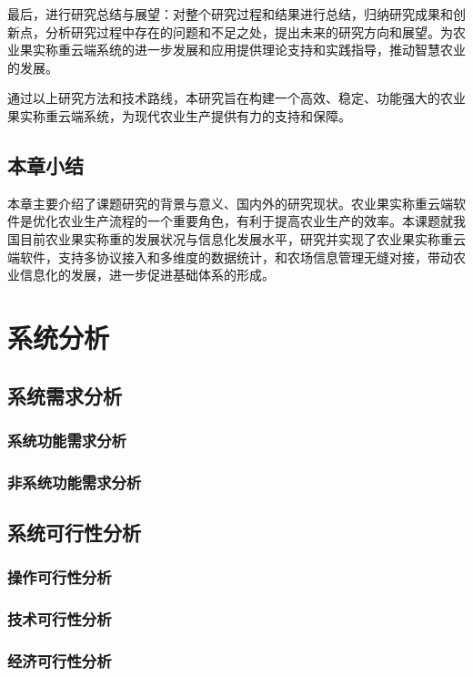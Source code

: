 \documentclass{xduugthesis}
\begin{document}
最后，进行研究总结与展望：对整个研究过程和结果进行总结，归纳研究成果和创新点，分析研究过程中存在的问题和不足之处，提出未来的研究方向和展望。为农业果实称重云端系统的进一步发展和应用提供理论支持和实践指导，推动智慧农业的发展。

通过以上研究方法和技术路线，本研究旨在构建一个高效、稳定、功能强大的农业果实称重云端系统，为现代农业生产提供有力的支持和保障。

\section{本章小结}

本章主要介绍了课题研究的背景与意义、国内外的研究现状。农业果实称重云端软件是优化农业生产流程的一个重要角色，有利于提高农业生产的效率。本课题就我国目前农业果实称重的发展状况与信息化发展水平，研究并实现了农业果实称重云端软件，支持多协议接入和多维度的数据统计，和农场信息管理无缝对接，带动农业信息化的发展，进一步促进基础体系的形成。


\chapter{系统分析}

\section{系统需求分析}
\subsection{系统功能需求分析}
\subsection{非系统功能需求分析}

\section{系统可行性分析}
\subsection{操作可行性分析}
\subsection{技术可行性分析}
\subsection{经济可行性分析}
\end{document}
